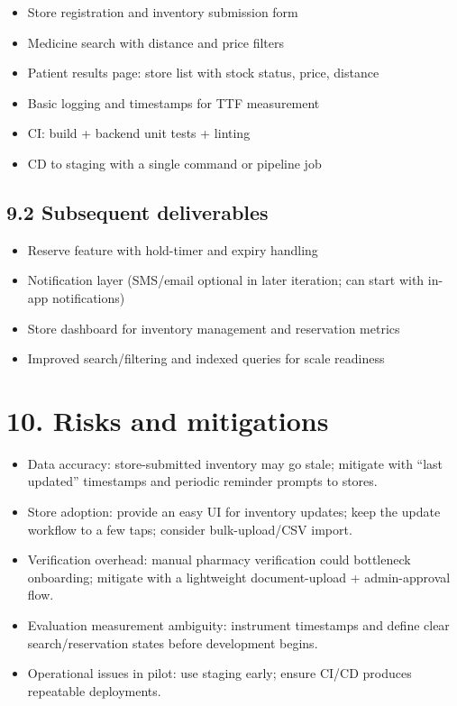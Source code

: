\documentclass[
]{article}
\begin{document}
\begin{itemize}
\item
  Store registration and inventory submission form
\item
  Medicine search with distance and price filters
\item
  Patient results page: store list with stock status, price, distance
\item
  Basic logging and timestamps for TTF measurement
\item
  CI: build + backend unit tests + linting
\item
  CD to staging with a single command or pipeline job
\end{itemize}

\subsection{\texorpdfstring{\textbf{9.2 Subsequent
deliverables}}{9.2 Subsequent deliverables}}\label{subsequent-deliverables}

\begin{itemize}
\item
  Reserve feature with hold-timer and expiry handling
\item
  Notification layer (SMS/email optional in later iteration; can start
  with in-app notifications)
\item
  Store dashboard for inventory management and reservation metrics
\item
  Improved search/filtering and indexed queries for scale readiness
\end{itemize}

\section{\texorpdfstring{\textbf{10. Risks and
mitigations}}{10. Risks and mitigations}}\label{risks-and-mitigations}

\begin{itemize}
\item
  Data accuracy: store-submitted inventory may go stale; mitigate with
  ``last updated'' timestamps and periodic reminder prompts to stores.
\item
  Store adoption: provide an easy UI for inventory updates; keep the
  update workflow to a few taps; consider bulk-upload/CSV import.
\item
  Verification overhead: manual pharmacy verification could bottleneck
  onboarding; mitigate with a lightweight document-upload +
  admin-approval flow.
\item
  Evaluation measurement ambiguity: instrument timestamps and define
  clear search/reservation states before development begins.
\item
  Operational issues in pilot: use staging early; ensure CI/CD produces
  repeatable deployments.
\end{itemize}
\end{document}
